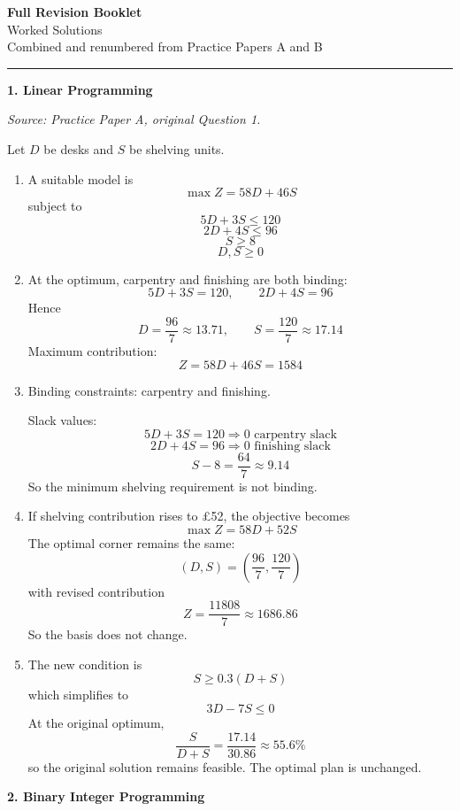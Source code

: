 \documentclass[11pt,a4paper]{article}
\begin{document}
\begin{center}
{\Large\bfseries\color{bookletblue} Full Revision Booklet}\\[0.4em]
{\large Worked Solutions}\\[0.3em]
{\color{bookletgrey} Combined and renumbered from Practice Papers A and B}
\end{center}

\vspace{0.8em}
\hrule
\vspace{1em}
\textbf{1. Linear Programming}

\textit{Source: Practice Paper A, original Question 1.}



Let $D$ be desks and $S$ be shelving units.

\begin{enumerate}
\item A suitable model is
\[
\max Z = 58D + 46S
\]
subject to
\[
5D + 3S \le 120
\]
\[
2D + 4S \le 96
\]
\[
S \ge 8
\]
\[
D,S \ge 0
\]

\item At the optimum, carpentry and finishing are both binding:
\[
5D+3S=120,\qquad 2D+4S=96
\]
Hence
\[
D=\frac{96}{7}\approx 13.71,\qquad S=\frac{120}{7}\approx 17.14
\]
Maximum contribution:
\[
Z=58D+46S=1584
\]

\item Binding constraints: carpentry and finishing.

Slack values:
\[
5D+3S=120 \Rightarrow 0 \text{ carpentry slack}
\]
\[
2D+4S=96 \Rightarrow 0 \text{ finishing slack}
\]
\[
S-8=\frac{64}{7}\approx 9.14
\]
So the minimum shelving requirement is not binding.

\item If shelving contribution rises to \pounds52, the objective becomes
\[
\max Z=58D+52S
\]
The optimal corner remains the same:
\[
\left(D,S\right)=\left(\frac{96}{7},\frac{120}{7}\right)
\]
with revised contribution
\[
Z=\frac{11808}{7}\approx 1686.86
\]
So the basis does not change.

\item The new condition is
\[
S \ge 0.3(D+S)
\]
which simplifies to
\[
3D-7S \le 0
\]
At the original optimum,
\[
\frac{S}{D+S}=\frac{17.14}{30.86}\approx 55.6\%
\]
so the original solution remains feasible. The optimal plan is unchanged.
\end{enumerate}

\newpage

\textbf{2. Binary Integer Programming}
\end{document}

